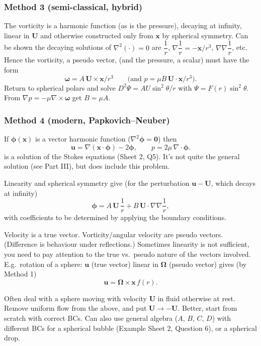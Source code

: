 \documentclass{article}
\begin{document}
\subsubsection{Method 3 (semi-classical, hybrid)}

The vorticity is a harmonic function (as is the pressure), decaying at infinity, linear in $\mathbf{U}$ and otherwise constructed only from $\mathbf{x}$ by spherical symmetry. Can be shown the decaying solutions of $\nabla^2(\cdot) = 0$ are $\dfrac{1}{r}$, $\nabla\dfrac{1}{r} = -\mathbf{x}/r^3$, $\nabla\nabla\dfrac{1}{r}$, etc. Hence the vorticity, a pseudo vector, (and the pressure, a scalar) must have the form
\[
  \boldsymbol{\omega} = A\,\mathbf{U}\times\mathbf{x}/r^3
  \qquad\bigl(\text{and } p = \mu B\,\mathbf{U}\cdot\mathbf{x}/r^3\bigr).
\]
Return to spherical polars and solve $D^2\Psi = AU\sin^2\theta / r$ with $\Psi = F(r)\sin^2\theta$. From $\nabla p = -\mu\nabla\times\boldsymbol{\omega}$ get $B = \mu A$.

\subsubsection{Method 4 (modern, Papkovich--Neuber)}

If $\boldsymbol{\phi}(\mathbf{x})$ is a vector harmonic function ($\nabla^2\boldsymbol{\phi} = \mathbf{0}$) then
\[
  \mathbf{u} = \nabla(\mathbf{x}\cdot\boldsymbol{\phi}) - 2\boldsymbol{\phi},
  \qquad
  p = 2\mu\,\nabla\cdot\boldsymbol{\phi}.
\]
is a solution of the Stokes equations (Sheet 2, Q5). It's not quite the general solution (see Part III), but does include this problem.

Linearity and spherical symmetry give (for the perturbation $\mathbf{u} - \mathbf{U}$, which decays at infinity)
\[
  \boldsymbol{\phi} = A\,\mathbf{U}\,\frac{1}{r} + B\,\mathbf{U}\cdot\nabla\nabla\frac{1}{r},
\]
with coefficients to be determined by applying the boundary conditions.

\begin{remark}

Velocity is a true vector. Vorticity/angular velocity are pseudo vectors. (Difference is behaviour under reflections.) Sometimes linearity is not sufficient, you need to pay attention to the true vs.\ pseudo nature of the vectors involved. E.g.\ rotation of a sphere: $\mathbf{u}$ (true vector) linear in $\boldsymbol{\Omega}$ (pseudo vector) gives (by Method 1)
\[
  \mathbf{u} = \boldsymbol{\Omega}\times\mathbf{x}\, f(r).
\]
\end{remark}
\begin{remark}
Often deal with a sphere moving with velocity $\mathbf{U}$ in fluid otherwise at rest. Remove uniform flow from the above, and put $\mathbf{U} \to -\mathbf{U}$. Better, start from scratch with correct BCs. Can also use general algebra ($A$, $B$, $C$, $D$) with different BCs for a spherical bubble (Example Sheet 2, Question 6), or a spherical drop.
\end{remark}
\end{document}
